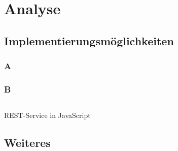 \sffamily
\chapter{Analyse}\label{cha:Analyse}

\section{Implementierungsmöglichkeiten}
\subsection{A}
\blindtext

\subsection{B}
\blindtext

\begin{listing}[H]
	\inputminted{js}{Code/rest.js}
	\unskip
	\caption{REST-Service in JavaScript}
	\label{lst:rest_php}
\end{listing}
\unskip %

\section{Weiteres}
\blindtext